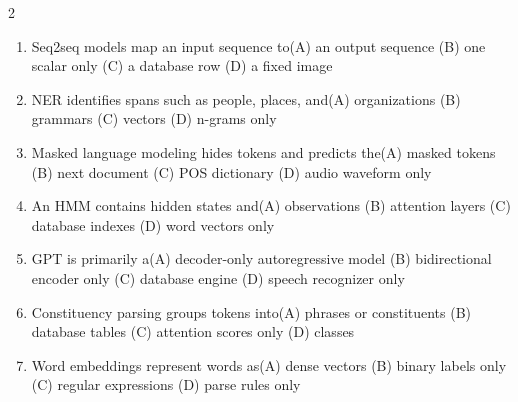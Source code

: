 \documentclass[a4paper]{article}
\begin{document}
\begin{multicols*}{2}
\begin{enumerate}
\item Seq2seq models map an input sequence to\newline\hspace*{0.6em}(A) an output sequence \quad (B) one scalar only \newline\hspace*{0.6em}(C) a database row \quad (D) a fixed image
\item NER identifies spans such as people, places, and\newline\hspace*{0.6em}(A) organizations \quad (B) grammars \newline\hspace*{0.6em}(C) vectors \quad (D) n-grams only
\item Masked language modeling hides tokens and predicts the\newline\hspace*{0.6em}(A) masked tokens \quad (B) next document \newline\hspace*{0.6em}(C) POS dictionary \quad (D) audio waveform only
\item An HMM contains hidden states and\newline\hspace*{0.6em}(A) observations \quad (B) attention layers \newline\hspace*{0.6em}(C) database indexes \quad (D) word vectors only
\item GPT is primarily a\newline\hspace*{0.6em}(A) decoder-only autoregressive model \quad (B) bidirectional encoder only \newline\hspace*{0.6em}(C) database engine \quad (D) speech recognizer only
\item Constituency parsing groups tokens into\newline\hspace*{0.6em}(A) phrases or constituents \quad (B) database tables \newline\hspace*{0.6em}(C) attention scores only \quad (D) classes
\item Word embeddings represent words as\newline\hspace*{0.6em}(A) dense vectors \quad (B) binary labels only \newline\hspace*{0.6em}(C) regular expressions \quad (D) parse rules only

\end{enumerate}
\end{multicols*}
\end{document}
